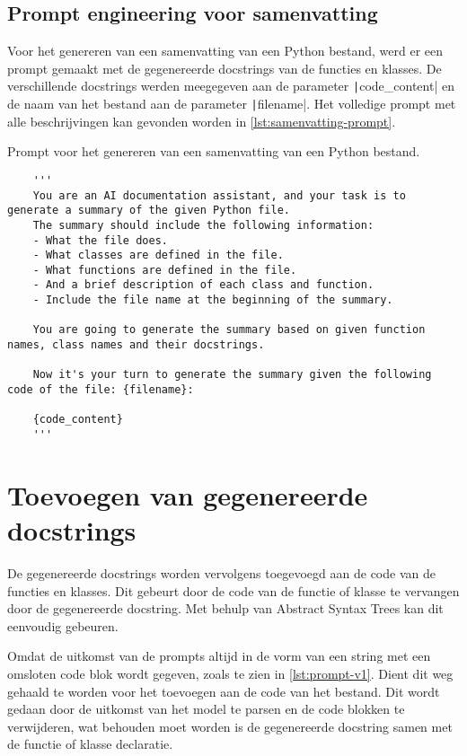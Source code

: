 \subsection{Prompt engineering voor samenvatting}
Voor het genereren van een samenvatting van een Python bestand, werd er een prompt gemaakt met de gegenereerde docstrings van de functies en klasses.
De verschillende docstrings werden meegegeven aan de parameter \texttt|code_content| en de naam van het bestand aan de parameter 
\texttt|filename|.
Het volledige prompt met alle beschrijvingen kan gevonden worden in \ref{lst:samenvatting-prompt}.

\begin{listing}
    \caption{Prompt voor het genereren van een samenvatting van een Python bestand.}
    \label{lst:samenvatting-prompt}
    \begin{verbatim}
    '''
    You are an AI documentation assistant, and your task is to generate a summary of the given Python file. 
    The summary should include the following information:
    - What the file does.
    - What classes are defined in the file.
    - What functions are defined in the file.
    - And a brief description of each class and function.
    - Include the file name at the beginning of the summary.
    
    You are going to generate the summary based on given function names, class names and their docstrings.
    
    Now it's your turn to generate the summary given the following code of the file: {filename}:

    {code_content}
    '''
    \end{verbatim}
\end{listing}

\section{Toevoegen van gegenereerde docstrings}
\label{sec:bestanddocumentatie-vervangen}
De gegenereerde docstrings worden vervolgens toegevoegd aan de code van de functies en klasses.
Dit gebeurt door de code van de functie of klasse te vervangen door de gegenereerde docstring.
Met behulp van Abstract Syntax Trees kan dit eenvoudig gebeuren.

Omdat de uitkomst van de prompts altijd in de vorm van een string met een omsloten code blok wordt gegeven, zoals te zien in \ref{lst:prompt-v1}.
Dient dit weg gehaald te worden voor het toevoegen aan de code van het bestand. 
Dit wordt gedaan door de uitkomst van het model te parsen en de code blokken te verwijderen, wat behouden moet worden is de gegenereerde docstring samen met de functie of klasse declaratie.

